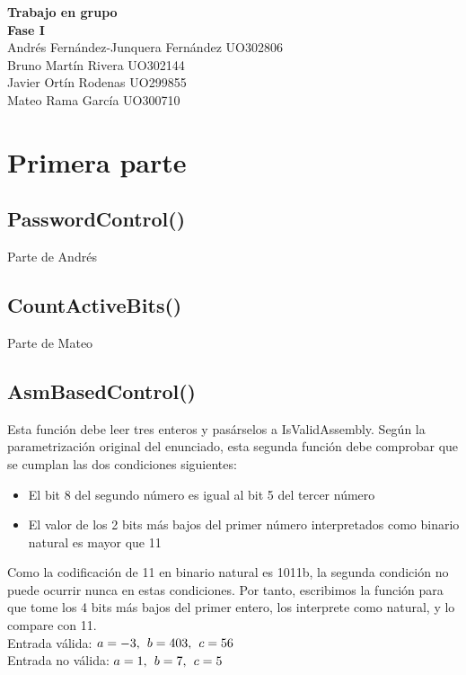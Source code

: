 \documentclass{article}
\begin{document}
\thispagestyle{empty}
\vfill
\begin{center}
    {\Huge \bfseries \sffamily Trabajo en grupo} \\[5ex]
    {\LARGE \bfseries \sffamily Fase I} \\[10ex]
    \Large {
        Andrés Fernández-Junquera Fernández UO302806\\[3ex]
        Bruno Martín Rivera UO302144\\[3ex]
        Javier Ortín Rodenas UO299855\\[3ex]
        Mateo Rama García UO300710
    }
\end{center}
\vfill 

\newpage
\tableofcontents
\newpage

\section{Primera parte}
\subsection{PasswordControl()}
Parte de Andrés
\subsection{CountActiveBits()}
Parte de Mateo
\subsection{AsmBasedControl()}
\hspace{1mm}
Esta función debe leer tres enteros y pasárselos a IsValidAssembly.
Según la parametrización original del enunciado, esta segunda función debe comprobar que se
cumplan las dos condiciones siguientes:
\begin{itemize}
    \item El bit 8 del segundo número es igual al bit 5 del tercer número
    \item El valor de los 2 bits más bajos del primer número interpretados como 
        binario natural es mayor que 11
\end{itemize}
Como la codificación de 11 en binario natural es 1011b, la segunda condición no puede
ocurrir nunca en estas condiciones. Por tanto, escribimos la función para que tome los 4 bits
más bajos del primer entero, los interprete como natural, y lo compare con 11.
\\[3ex]
\noindent Entrada válida: $a = -3, \hspace{1.5mm} b = 403, \hspace{1.5mm} c = 56$ \\[2ex]
\noindent Entrada no válida: $a = 1, \hspace{1.5mm} b = 7, \hspace{1.5mm} c = 5$
\end{document}
